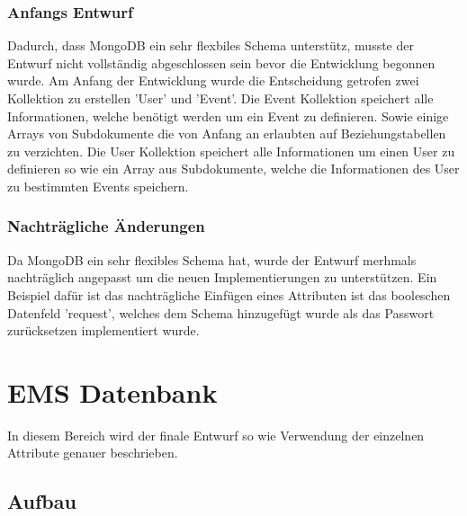 \subsubsection{Anfangs Entwurf}
Dadurch, dass MongoDB ein sehr flexbiles Schema unterstütz, musste der Entwurf nicht vollständig abgeschlossen sein bevor die Entwicklung begonnen wurde.
Am Anfang der Entwicklung wurde die Entscheidung getrofen zwei Kollektion zu erstellen 'User' und 'Event'.
Die Event Kollektion speichert alle Informationen, welche benötigt werden um ein Event zu definieren.
Sowie einige Arrays von Subdokumente die von Anfang an erlaubten auf Beziehungstabellen zu verzichten.
Die User Kollektion speichert alle Informationen um einen User zu definieren so wie ein Array aus Subdokumente, welche die Informationen des User zu bestimmten Events speichern. 
\subsubsection{Nachträgliche Änderungen}
Da MongoDB ein sehr flexibles Schema hat, wurde der Entwurf merhmals nachträglich angepasst um die neuen Implementierungen zu unterstützen. 
Ein Beispiel dafür ist das nachträgliche Einfügen eines Attributen ist das booleschen Datenfeld 'request', welches dem Schema hinzugefügt wurde als das Passwort zurücksetzen implementiert wurde.			
\newpage
\section{EMS Datenbank}
In diesem Bereich wird der finale Entwurf so wie Verwendung der einzelnen Attribute genauer beschrieben.	
\subsection{Aufbau}
